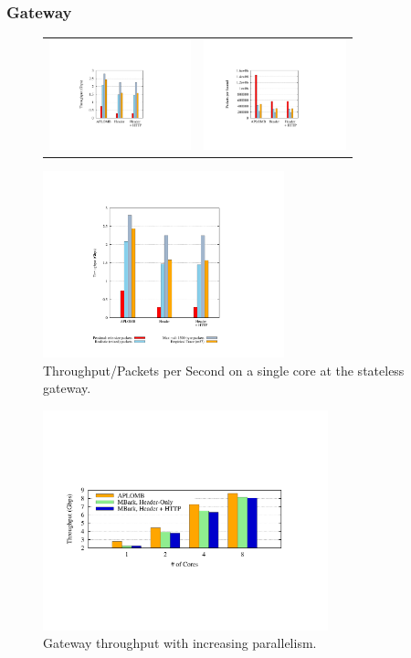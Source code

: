 \subsubsection{Gateway}

\begin{figure}[t]
  \centering
  \begin{tabular}{cc}
  \includegraphics[height=1.25in]{fig/gatewayxput}&
  \includegraphics[height=1.25in]{fig/gateway_pps}\\
  \end{tabular}
  \includegraphics[width=2.75in]{fig/key}
  \caption[]{\label{fig:gwxput} Throughput/Packets per Second on a single core at the stateless gateway.}
\end{figure}

\begin{figure}[t]
  \centering
  \includegraphics[width=3.25in]{fig/gateway_scale}
  \caption[]{\label{fig:gwscale} Gateway throughput with increasing parallelism.}
\end{figure}
  
